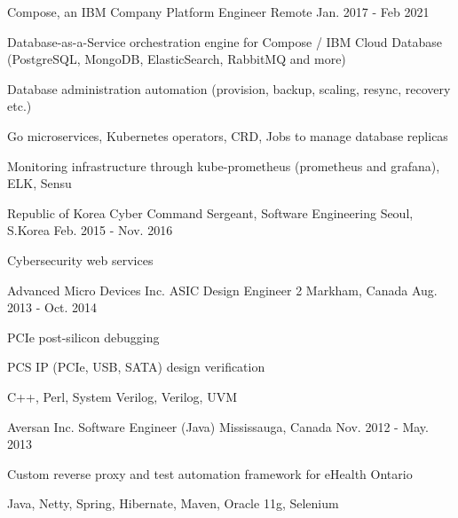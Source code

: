\begin{cventries}
  \cventry
    {Compose, an IBM Company} %
    {Platform Engineer} %
    {Remote} %
    {Jan. 2017 - Feb 2021} %
    {
      \begin{cvitems} %
        \item {Database-as-a-Service orchestration engine for Compose / IBM Cloud Database (PostgreSQL, MongoDB, ElasticSearch, RabbitMQ and more)}
        \item {Database administration automation (provision, backup, scaling, resync, recovery etc.)}
        \item {Go microservices, Kubernetes operators, CRD, Jobs to manage database replicas}
        \item {Monitoring infrastructure through kube-prometheus (prometheus and grafana), ELK, Sensu}
      \end{cvitems}
    }

  \cventry
    {Republic of Korea Cyber Command} %
    {Sergeant, Software Engineering} %
    {Seoul, S.Korea} %
    {Feb. 2015 - Nov. 2016} %
    {
      \begin{cvitems} %
        \item {Cybersecurity web services}
      \end{cvitems}
    }

  \cventry
    {Advanced Micro Devices Inc.} %
    {ASIC Design Engineer 2} %
    {Markham, Canada} %
    {Aug. 2013 - Oct. 2014} %
    {
      \begin{cvitems} %
        \item {PCIe post-silicon debugging}
        \item {PCS IP (PCIe, USB, SATA) design verification}
        \item {C++, Perl, System Verilog, Verilog, UVM}
      \end{cvitems}
    }

  \cventry
    {Aversan Inc.} %
    {Software Engineer (Java)} %
    {Mississauga, Canada} %
    {Nov. 2012 - May. 2013} %
    {
      \begin{cvitems} %
        \item {Custom reverse proxy and test automation framework for eHealth Ontario}
        \item {Java, Netty, Spring, Hibernate, Maven, Oracle 11g, Selenium}
      \end{cvitems}
    }


\end{cventries}
